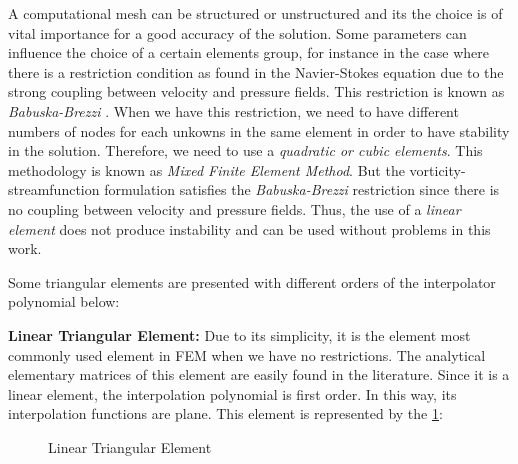 A computational mesh can be structured or unstructured and 
its the choice is of
vital importance for a good accuracy of the solution. 
Some parameters can influence the choice of a certain elements group, 
for instance in the case where there is a restriction condition 
as found in the Navier-Stokes equation due to the strong coupling 
between velocity and pressure fields. 
This restriction is known as \textit{Babuska-Brezzi} 
\cite{babuska1971} \cite{brezzi1974}. 
When we have this restriction, 
we need to have different numbers of nodes for each unkowns 
in the same element in order to have stability in the solution.
Therefore, we need to use a \textit{quadratic or cubic elements}. 
This methodology is known as \textit{Mixed Finite Element Method}. 
But the vorticity-streamfunction formulation satisfies 
the \textit{Babuska-Brezzi} restriction since there is no coupling 
between velocity and pressure fields. 
Thus, the use of a \textit{linear element} does not produce 
instability and can be used without problems in this work.

\medskip
Some triangular elements are presented with different orders of the interpolator polynomial below:

\medskip
\noindent
\textbf{Linear Triangular Element:} 
Due to its simplicity, 
it is the element most commonly used element in FEM when 
we have no restrictions. The analytical elementary matrices 
of this element are easily found in the literature. 
Since it is a linear element, the interpolation
polynomial is first order. 
In this way, its interpolation functions are plane. 
This element is represented by the \ref{elemento triangular linear}:


\begin{figure}[H]
\begin{center}
\end{center}
\caption{Linear Triangular Element}
\label{elemento triangular linear}
\end{figure}

